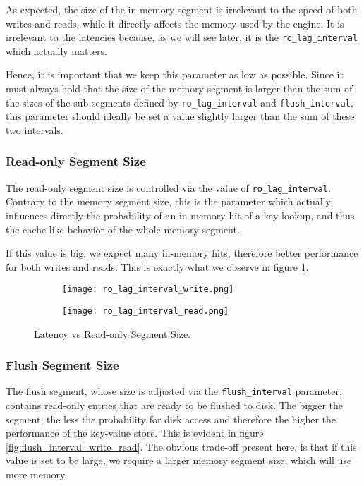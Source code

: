 As expected, the size of the in-memory segment is irrelevant to the speed of both writes and reads, while it directly affects the memory used by the engine. It is irrelevant to the latencies because, as we will see later, it is the \verb"ro_lag_interval" which actually matters.

Hence, it is important that we keep this parameter as low as possible. Since it must always hold that the size of the memory segment is larger than the sum of the sizes of the sub-segments defined by \verb"ro_lag_interval" and \verb"flush_interval", this parameter should ideally be set a value slightly larger than the sum of these two intervals.

\subsubsection{Read-only Segment Size}

The read-only segment size is controlled via the value of \verb"ro_lag_interval". Contrary to the memory segment size, this is the parameter which actually influences directly the probability of an in-memory hit of a key lookup, and thus the cache-like behavior of the whole memory segment.

If this value is big, we expect many in-memory hits, therefore better performance for both writes and reads. This is exactly what we observe in figure \ref{fig:ro_lag_interval}.

\begin{figure}[h]
    \begin{subfigure}{.5\textwidth}
        \centering
        \texttt{[image: ro\_lag\_interval\_write.png]}
    \end{subfigure}
    \begin{subfigure}{.5\textwidth}
        \centering
        \texttt{[image: ro\_lag\_interval\_read.png]}
    \end{subfigure}
    \caption{Latency vs Read-only Segment Size.}
    \label{fig:ro_lag_interval}
\end{figure}

\subsubsection{Flush Segment Size}

The flush segment, whose size is adjusted via the \verb"flush_interval" parameter, contains read-only entries that are ready to be flushed to disk. The bigger the segment, the less the probability for disk access and therefore the higher the performance of the key-value store. This is evident in figure \ref{fig:flush_interval_write_read}. The obvious trade-off present here, is that if this value is set to be large, we require a larger memory segment size, which will use more memory.


